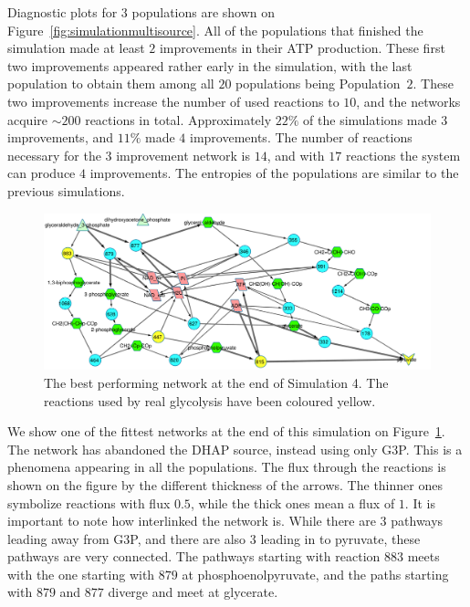 \documentclass[a4paper,12pt]{article}
\begin{document}
Diagnostic plots for $3$ populations are shown on Figure~\ref{fig:simulationmultisource}. All of the populations that finished the simulation made at least $2$ improvements in their ATP production. These first two improvements appeared rather early in the simulation, with the last population to obtain them among all $20$ populations being Population~$2$. These two improvements increase the number of used reactions to $10$, and the networks acquire $\sim 200$ reactions in total. Approximately $22\%$ of the simulations made $3$ improvements, and $11\%$ made $4$ improvements. The number of reactions necessary for the $3$ improvement network is $14$, and with $17$ reactions the system can produce $4$ improvements. The entropies of the populations are similar to the previous simulations. 



\begin{figure}[htpb]
	\centering
	\includegraphics[width=1\linewidth]{multisink_finalnet.pdf}
	\caption{The best performing network at the end of Simulation 4. The reactions used by real glycolysis have been coloured yellow. }
	\label{fig:multi}
\end{figure}

We show one of the fittest networks at the end of this simulation on Figure~\ref{fig:multi}. The network has abandoned the DHAP source, instead using only G3P. This is a phenomena appearing in all the populations. The flux through the reactions is shown on the figure by the different thickness of the arrows. The thinner ones symbolize reactions with flux $0.5$, while the thick ones mean a flux of $1$. It is important to note how interlinked the network is. While there are 3 pathways leading away from G3P, and there are also $3$ leading in to pyruvate, these pathways are very connected. The pathways starting with reaction $883$ meets with the one starting with $879$ at phosphoenolpyruvate, and the paths starting with $879$ and $877$ diverge and meet at glycerate. 
\end{document}

